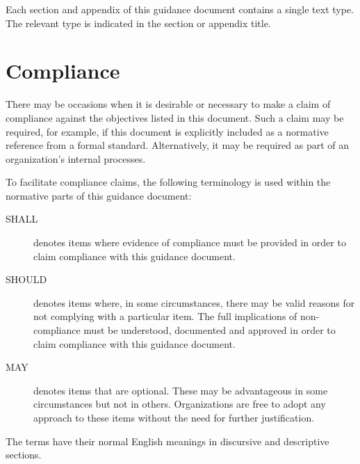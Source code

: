 Each section and appendix of this guidance document contains a single text type. The relevant type is indicated in the section or appendix title.

\chapter{Compliance}
There may be occasions when it is desirable or necessary to make a claim of compliance against the objectives listed in this document. Such a claim may be required, for example, if this document is explicitly included as a normative reference from a formal standard. Alternatively, it may be required as part of an organization's internal processes.

To facilitate compliance claims, the following terminology is used within the normative parts of this guidance document:
\begin{description}
	\item[SHALL] denotes items where evidence of compliance must be provided in order to claim compliance with this guidance document.
	\item[SHOULD] denotes items where, in some circumstances, there may be valid reasons for not complying with a particular item. The full implications of non-compliance must be understood, documented and approved in order to claim compliance with this guidance document.
	\item[MAY] denotes items that are optional. These may be advantageous in some circumstances but not in others. Organizations are free to adopt any approach to these items without the need for further justification.
\end{description}

The terms have their normal English meanings in discursive and descriptive sections.
